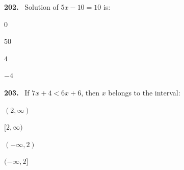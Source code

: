 \documentclass[11pt]{article}
\newenvironment{qenv}[1]{%
  \par\medskip\noindent\textbf{#1.}\ \ignorespaces
}{\par}
\begin{document}
\begin{qenv}{202} Solution of $5x-10=10$ is:
\begin{options} \item $0$ \item $50$ \item $4$ \item $-4$ \end{options} \end{qenv}

\begin{qenv}{203} If $7x+4<6x+6$, then $x$ belongs to the interval:
\begin{options} \item $(2,\infty)$ \item $[2,\infty)$ \item $(-\infty,2)$ \item $(-\infty,2]$ \end{options} \end{qenv}
\end{document}
